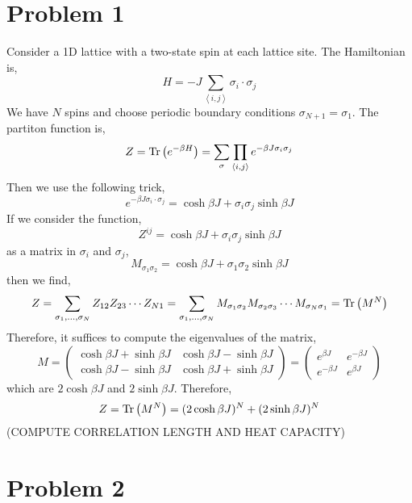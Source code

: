\documentclass[12pt]{extarticle}
\begin{document}

\newcommand{\nderiv}[3]{\frac{\mathrm{d}^{#1}{#2}}{\mathrm{d}{#3}^{#1}}}

\section{Problem 1}

Consider a 1D lattice with a two-state spin at each lattice site. The Hamiltonian is,
\[ H = - J \sum_{\left< i, j \right>} \sigma_i \cdot \sigma_j \]
We have $N$ spins and choose periodic boundary conditions $\sigma_{N+1} = \sigma_1$. The partiton function is,
\[ Z = \mathrm{Tr} \left( e^{-\beta H} \right) = \sum_{\sigma} \prod_{\left<i, j \right>} e^{-\beta J \sigma_i \sigma_j } \]
Then we use the following trick,
\[ e^{-\beta J \sigma_i \cdot \sigma_j} =  \cosh{\beta J} + \sigma_i \sigma_j \sinh{\beta J} \]
If we consider the function,  
\[ Z^{ij} =  \cosh{\beta J} + \sigma_i \sigma_j \sinh{\beta J} \]
as a matrix in $\sigma_{i}$ and $\sigma_j$,
\[ M_{\sigma_1 \sigma_2} =  \cosh{\beta J} + \sigma_1 \sigma_2 \sinh{\beta J} \]
then we find,
\[ Z = \sum_{\sigma_1, \dots, \sigma_N} Z_{12} Z_{23} \cdots Z_{N1} = \sum_{\sigma_1, \dots, \sigma_N} M_{\sigma_1 \sigma_2} M_{\sigma_2 \sigma_3} \cdots M_{\sigma_N \sigma_1} = \mathrm{Tr} \left( M^N \right) \]
Therefore, it suffices to compute the eigenvalues of the matrix, 
\[ M = \begin{pmatrix}
\cosh{\beta J} + \sinh{\beta J} & \cosh{\beta J} - \sinh{\beta J}
\\
\cosh{\beta J} - \sinh{\beta J} & \cosh{\beta J} + \sinh{\beta J} 
\end{pmatrix} 
= 
\begin{pmatrix}
e^{\beta J} & e^{-\beta J}
\\
e^{-\beta J} & e^{\beta J}
\end{pmatrix} \]
which are $2 \cosh{\beta J}$ and $2 \sinh{\beta J}$. Therefore,
\[ Z = \mathrm{Tr} \left( M^N \right) = (2 \cosh{\beta J})^N + (2 \sinh{\beta J})^N \]
(COMPUTE CORRELATION LENGTH AND HEAT CAPACITY)

\section{Problem 2}
\end{document}
